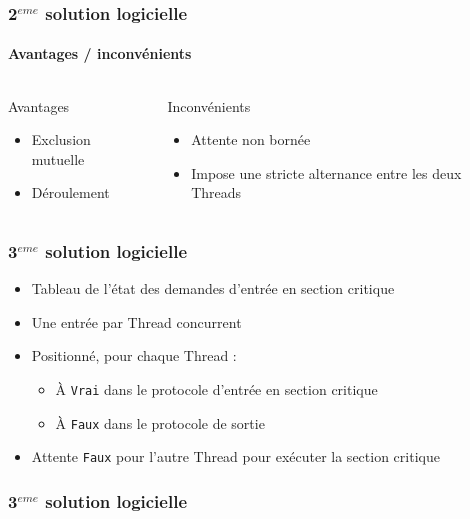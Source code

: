 \begin{frame}
\frametitle{2$^{eme}$ solution logicielle}
\framesubtitle{Avantages / inconvénients}
\begin{columns}
\begin{block}{Avantages}
\begin{itemize}
\item Exclusion mutuelle
\item Déroulement
\end{itemize}
\end{block}
\begin{block}{Inconvénients}
\begin{itemize}
\item Attente non bornée
\item Impose une stricte alternance entre les deux Threads
\end{itemize}
\end{block}
\end{columns}
\end{frame}

\begin{frame}
\frametitle{3$^{eme}$ solution logicielle}
\begin{itemize}
\item Tableau de l’état des demandes d’entrée en section critique
\item Une entrée par Thread concurrent
\item Positionné, pour chaque Thread :
\begin{itemize}
\item À \texttt{Vrai} dans le protocole d’entrée en section critique
\item À \texttt{Faux} dans le protocole de sortie
\end{itemize}
\item Attente \texttt{Faux} pour l’autre Thread pour exécuter la section critique
\end{itemize}
\end{frame}

\begin{frame}
\frametitle{3$^{eme}$ solution logicielle}
\begin{scriptsize}\end{scriptsize}
\end{frame}

